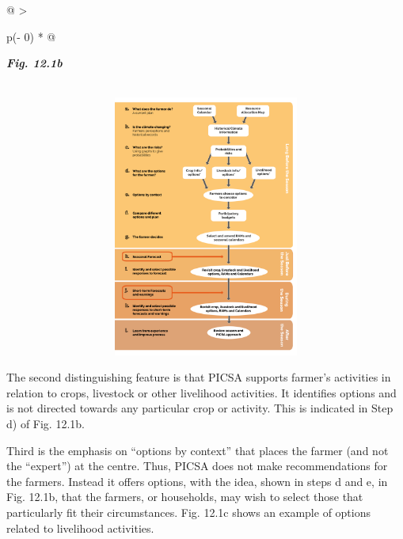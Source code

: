 \documentclass[
  letterpaper,
  DIV=11,
  numbers=noendperiod]{scrreprt}
\begin{document}
\begin{longtable}[]{@{}
  >{\raggedright\arraybackslash}p{(\columnwidth - 0\tabcolsep) * }@{}}
\toprule\noalign{}
\begin{minipage}[b]{\linewidth}\raggedright
\textbf{\emph{Fig. 12.1b}}
\end{minipage} \\
\midrule\noalign{}
\endhead
\bottomrule\noalign{}
\endlastfoot
\includegraphics[width=5.55194in,height=3.38739in]{figures/Fig12.1b.png} \\
\end{longtable}

The second distinguishing feature is that PICSA supports farmer's
activities in relation to crops, livestock or other livelihood
activities. It identifies options and is not directed towards any
particular crop or activity. This is indicated in Step d) of Fig. 12.1b.

Third is the emphasis on ``options by context'' that places the farmer
(and not the ``expert'') at the centre. Thus, PICSA does not make
recommendations for the farmers. Instead it offers options, with the
idea, shown in steps d and e, in Fig. 12.1b, that the farmers, or
households, may wish to select those that particularly fit their
circumstances. Fig. 12.1c shows an example of options related to
livelihood activities.
\end{document}
